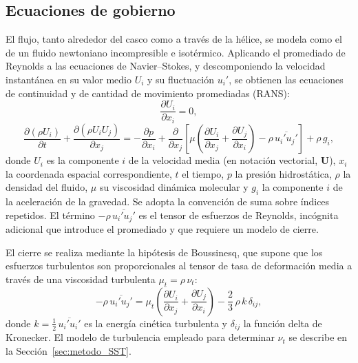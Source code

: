 \subsection{Ecuaciones de gobierno}
\label{sec:ecuaciones_gobierno}
 
El flujo, tanto alrededor del casco como a través de la hélice, se modela como el de un fluido newtoniano
incompresible e isotérmico. Aplicando el promediado de Reynolds a las
ecuaciones de Navier--Stokes, y descomponiendo la velocidad instantánea en
su valor medio $U_i$ y su fluctuación $u_i'$, se obtienen las ecuaciones de
continuidad y de cantidad de movimiento promediadas (RANS):
%
\begin{equation}\label{eq:continuidad}
    \frac{\partial U_i}{\partial x_i} = 0,
\end{equation}
%
\begin{equation}\label{eq:rans}
    \frac{\partial (\rho U_i)}{\partial t}
    + \frac{\partial (\rho U_i U_j)}{\partial x_j}
    = -\frac{\partial p}{\partial x_i}
    + \frac{\partial}{\partial x_j}
      \left[ \mu \left( \frac{\partial U_i}{\partial x_j}
      + \frac{\partial U_j}{\partial x_i} \right)
      - \rho\,\overline{u_i' u_j'} \right]
    + \rho\, g_i ,
\end{equation}
%
donde $U_i$ es la componente $i$ de la velocidad media (en notación vectorial, $\mathbf{U}$), $x_i$ la coordenada
espacial correspondiente, $t$ el tiempo, $p$ la presión hidrostática, $\rho$ la
densidad del fluido, $\mu$ su viscosidad dinámica molecular y $g_i$ la
componente $i$ de la aceleración de la gravedad. Se adopta la convención de
suma sobre índices repetidos. El término $-\rho\,\overline{u_i' u_j'}$ es el
tensor de esfuerzos de Reynolds, incógnita adicional que introduce el
promediado y que requiere un modelo de cierre.
 
El cierre se realiza mediante la hipótesis de Boussinesq, que supone que los
esfuerzos turbulentos son proporcionales al tensor de tasa de deformación
media a través de una viscosidad turbulenta $\mu_t = \rho\,\nu_t$:
%
\begin{equation}\label{eq:boussinesq}
    -\rho\,\overline{u_i' u_j'} =
    \mu_t \left( \frac{\partial U_i}{\partial x_j}
    + \frac{\partial U_j}{\partial x_i} \right)
    - \frac{2}{3}\,\rho\,k\,\delta_{ij},
\end{equation}
%
donde $k = \tfrac{1}{2}\,\overline{u_i' u_i'}$ es la energía cinética
turbulenta y $\delta_{ij}$ la función delta de Kronecker. El modelo de turbulencia
empleado para determinar $\nu_t$ se describe en la
Sección~\ref{sec:metodo_SST}.
 
